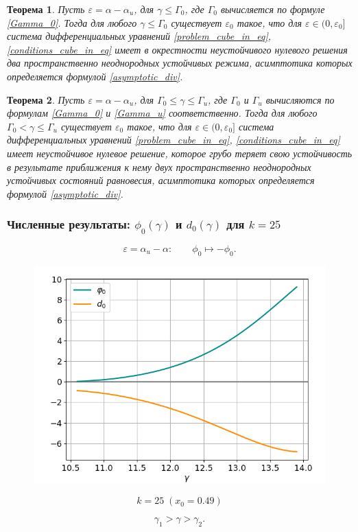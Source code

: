 \documentclass[fullscreen=true, unicode, bookmarks=false]{beamer}
\newtheorem{rustheorem}{Теорема }
\begin{document}
\begin{frame}

\begin{rustheorem}
Пусть $ \varepsilon = \alpha - \alpha_u$, для $ \gamma \leqslant \Gamma_0 $, где $ \Gamma_0 $ вычисляется по формуле \eqref{Gamma_0}. Тогда для любого $ \gamma \leqslant \Gamma_0 $ существует $ \varepsilon_0 $ такое, что для $ \varepsilon \in (0, \varepsilon_0] $ система дифференциальных уравнений \eqref{problem_cube_in_eq}, \eqref{conditions_cube_in_eq} имеет в окрестности неустойчивого нулевого решения два пространственно неоднородных устойчивых режима, асимптотика которых определяется формулой \eqref{asymptotic_div}.
\end{rustheorem}
\begin{rustheorem}
Пусть $ \varepsilon = \alpha - \alpha_u$, для $ \Gamma_0 \leqslant \gamma \leqslant \Gamma_u $, где $ \Gamma_0$ и $\Gamma_u $ вычисляются по формулам \eqref{Gamma_0} и \eqref{Gamma_u} соответственно. Тогда для любого $ \Gamma_0 < \gamma \leqslant \Gamma_u $ существует $ \varepsilon_0 $ такое, что для $ \varepsilon \in (0, \varepsilon_0] $ система дифференциальных уравнений \eqref{problem_cube_in_eq}, \eqref{conditions_cube_in_eq} имеет неустойчивое нулевое решение, которое грубо теряет свою устойчивость в результате приближения к нему двух пространственно неоднородных устойчивых состояний равновесия, асимптотика которых определяется формулой \eqref{asymptotic_div}.
\end{rustheorem}

\end{frame}

\begin{frame}
\frametitle{ Численные результаты: $ \phi_0(\gamma) $ и $ d_0(\gamma) $ для $ k=25 $ }

$$ \varepsilon = \alpha_u - \alpha: \qquad \phi_0 \longmapsto -\phi_0. $$

\vfill

\begin{figure}[h]
\includegraphics[scale=0.4]{divergent_phi0d0_049_P.png} 
\end{figure}
$$ k=25 \; (x_0=0.49) $$

\vfill

$$ \gamma_1 > \gamma > \gamma_2. $$

\end{frame}
\end{document}
